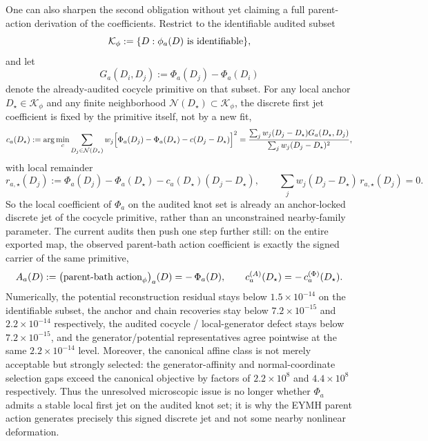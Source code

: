 \documentclass[aps,prd,onecolumn,notitlepage,nofootinbib,superscriptaddress,11pt,floatfix]{revtex4-2}
\begin{document}
One can also sharpen the second obligation without yet claiming a full parent-action derivation of the coefficients. Restrict to the identifiable audited subset
\[
\mathcal K_{\phi}:=\{D:\phi_a(D)\ {\rm is\ identifiable}\},
\]
and let
\[
G_a(D_i,D_j):=\Phi_a(D_j)-\Phi_a(D_i)
\]
denote the already-audited cocycle primitive on that subset. For any local anchor $D_\star\in\mathcal K_\phi$ and any finite neighborhood $\mathcal N(D_\star)\subset\mathcal K_\phi$, the discrete first jet coefficient is fixed by the primitive itself, not by a new fit,
\[
c_a(D_\star):=
\arg\min_c\sum_{D_j\in\mathcal N(D_\star)}
w_j\Bigl[\Phi_a(D_j)-\Phi_a(D_\star)-c(D_j-D_\star)\Bigr]^2
=
\frac{\sum_j w_j(D_j-D_\star)G_a(D_\star,D_j)}
{\sum_j w_j(D_j-D_\star)^2},
\]
with local remainder
\[
r_{a,\star}(D_j):=\Phi_a(D_j)-\Phi_a(D_\star)-c_a(D_\star)(D_j-D_\star),
\qquad
\sum_j w_j(D_j-D_\star)\,r_{a,\star}(D_j)=0.
\]
So the local coefficient of $\Phi_a$ on the audited knot set is already an anchor-locked discrete jet of the cocycle primitive, rather than an unconstrained nearby-family parameter. The current audits then push one step further still: on the entire exported map, the observed parent-bath action coefficient is exactly the signed carrier of the same primitive,
\[
A_a(D):=\bigl({\rm parent\text{-}bath\ action}_\phi\bigr)_a(D)=-\,\Phi_a(D),
\qquad
c_a^{(A)}(D_\star)=-\,c_a^{(\Phi)}(D_\star).
\]
Numerically, the potential reconstruction residual stays below $1.5\times10^{-14}$ on the identifiable subset, the anchor and chain recoveries stay below $7.2\times10^{-15}$ and $2.2\times10^{-14}$ respectively, the audited cocycle / local-generator defect stays below $7.2\times10^{-15}$, and the generator/potential representatives agree pointwise at the same $2.2\times10^{-14}$ level. Moreover, the canonical affine class is not merely acceptable but strongly selected: the generator-affinity and normal-coordinate selection gaps exceed the canonical objective by factors of $2.2\times10^{8}$ and $4.4\times10^{8}$ respectively. Thus the unresolved microscopic issue is no longer whether $\Phi_a$ admits a stable local first jet on the audited knot set; it is why the EYMH parent action generates precisely this signed discrete jet and not some nearby nonlinear deformation.
\end{document}
